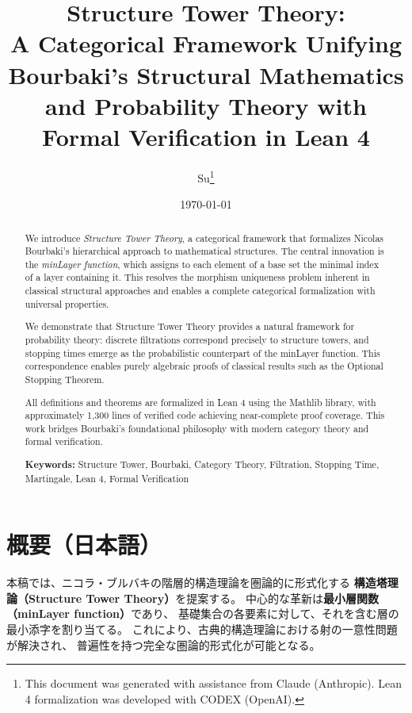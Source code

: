 \documentclass[11pt,a4paper]{article}
\title{%
  \textbf{Structure Tower Theory:}\\[0.3em]
  \large A Categorical Framework Unifying Bourbaki's Structural Mathematics\\
  and Probability Theory with Formal Verification in Lean 4
}
\author{%
  Su\thanks{%
    This document was generated with assistance from Claude (Anthropic). 
    Lean 4 formalization was developed with CODEX (OpenAI).
  }
}
\date{\today}
\theoremstyle{plain}
\theoremstyle{definition}
\begin{document}
\maketitle

\begin{abstract}
We introduce \emph{Structure Tower Theory}, a categorical framework that 
formalizes Nicolas Bourbaki's hierarchical approach to mathematical structures. 
The central innovation is the \emph{minLayer function}, which assigns to each 
element of a base set the minimal index of a layer containing it. This 
resolves the morphism uniqueness problem inherent in classical structural 
approaches and enables a complete categorical formalization with universal 
properties.

We demonstrate that Structure Tower Theory provides a natural framework for 
probability theory: discrete filtrations correspond precisely to structure 
towers, and stopping times emerge as the probabilistic counterpart of the 
minLayer function. This correspondence enables purely algebraic proofs of 
classical results such as the Optional Stopping Theorem.

All definitions and theorems are formalized in Lean 4 using the Mathlib 
library, with approximately 1,300 lines of verified code achieving near-complete 
proof coverage. This work bridges Bourbaki's foundational philosophy with 
modern category theory and formal verification.

\medskip
\noindent\textbf{Keywords:} Structure Tower, Bourbaki, Category Theory, 
Filtration, Stopping Time, Martingale, Lean 4, Formal Verification
\end{abstract}

\section*{概要（日本語）}

本稿では、ニコラ・ブルバキの階層的構造理論を圏論的に形式化する
\textbf{構造塔理論（Structure Tower Theory）}を提案する。
中心的な革新は\textbf{最小層関数（minLayer function）}であり、
基礎集合の各要素に対して、それを含む層の最小添字を割り当てる。
これにより、古典的構造理論における射の一意性問題が解決され、
普遍性を持つ完全な圏論的形式化が可能となる。
\end{document}
